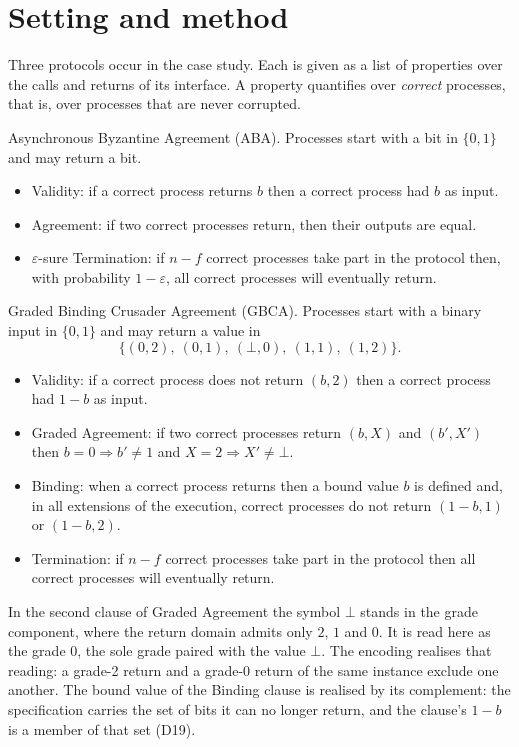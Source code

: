 \section{Setting and method}


Three protocols occur in the case study.
Each is given as a list of properties over the calls and returns of its interface.
A property quantifies over \emph{correct} processes, that is, over processes that are never corrupted.

Asynchronous Byzantine Agreement (ABA).
Processes start with a bit in $\{0,1\}$ and may return a bit.
\begin{itemize}
  \item Validity: if a correct process returns $b$ then a correct process had
    $b$ as input.
  \item Agreement: if two correct processes return, then their outputs are
    equal.
  \item $\varepsilon$-sure Termination: if $n-f$ correct processes take part in
    the protocol then, with probability $1-\varepsilon$, all correct processes will eventually return.
\end{itemize}

Graded Binding Crusader Agreement (GBCA).
Processes start with a binary input in $\{0,1\}$ and may return a value in
\[
  \{(0,2),\ (0,1),\ (\bot,0),\ (1,1),\ (1,2)\}.
\]
\begin{itemize}
  \item Validity: if a correct process does not return $(b,2)$ then a correct
    process had $1-b$ as input.
  \item Graded Agreement: if two correct processes return $(b,X)$ and
    $(b',X')$ then $b = 0 \Rightarrow b' \neq 1$ and $X = 2 \Rightarrow X' \neq \bot$.
  \item Binding: when a correct process returns then a bound value $b$ is
    defined and, in all extensions of the execution, correct processes do not return $(1-b,1)$ or $(1-b,2)$.
  \item Termination: if $n-f$ correct processes take part in the protocol then
    all correct processes will eventually return.
\end{itemize}
In the second clause of Graded Agreement the symbol $\bot$ stands in the grade component, where the return domain admits only $2$, $1$ and $0$. It is read here as the grade $0$, the sole grade paired with the value $\bot$.
The encoding realises that reading: a grade-2 return and a grade-0 return of the same instance exclude one another.
The bound value of the Binding clause is realised by its complement: the specification carries the set of bits it can no longer return, and the clause's $1-b$ is a member of that set (D19).


